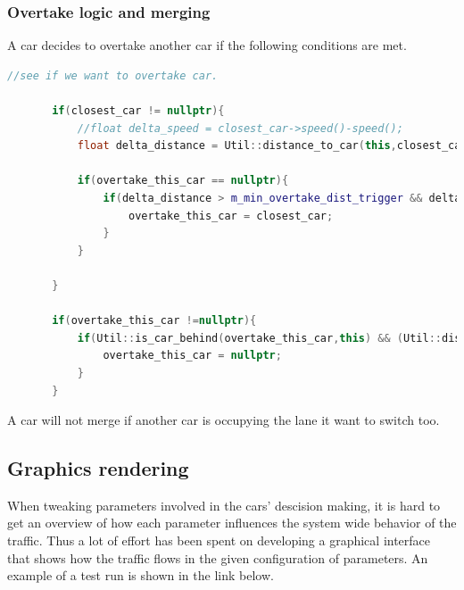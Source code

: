 \documentclass{article}
\begin{document}
    \subsubsection{Overtake logic and merging}
      A car decides to overtake another car if the following conditions are met.
      \begin{lstlisting}[language=C++]
          //see if we want to overtake car.

       if(closest_car != nullptr){
           //float delta_speed = closest_car->speed()-speed();
           float delta_distance = Util::distance_to_car(this,closest_car);

           if(overtake_this_car == nullptr){
               if(delta_distance > m_min_overtake_dist_trigger && delta_distance < m_max_overtake_dist_trigger && (target_speed()/closest_car->target_speed() > m_aggressiveness*1.0f ) && current_lane == 0 && closest_car->current_node->get_parent_segment()->get_lane_number(closest_car->current_node) == 0){
                   overtake_this_car = closest_car;
               }
           }

       }

       if(overtake_this_car !=nullptr){
           if(Util::is_car_behind(overtake_this_car,this) && (Util::distance_to_car(this,overtake_this_car) > m_overtake_done_dist)){
               overtake_this_car = nullptr;
           }
       }
      \end{lstlisting}
      A car will not merge if another car is occupying the lane it want to switch too.
  \subsection{Graphics rendering}
    When tweaking parameters involved in the cars' descision making, it is hard to
    get an overview of how each parameter influences the system wide behavior of the
    traffic. Thus a lot of effort has been spent on developing a graphical interface
    that shows how the traffic flows in the given configuration of parameters.
    An example of a test run is shown in the link below.
\end{document}
